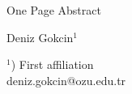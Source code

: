 \documentclass[a4paper]{article}
\begin{document}

\Large
\begin{center}
    One Page Abstract

    \hspace{10pt}

    \large
    Deniz Gokcin$^1$ \\

    \hspace{10pt}

    \small  
    $^1$) First affiliation\\
    deniz.gokcin@ozu.edu.tr\\

\end{center}

\hspace{10pt}

\normalsize

\lipsum[1-2]
\end{document}
